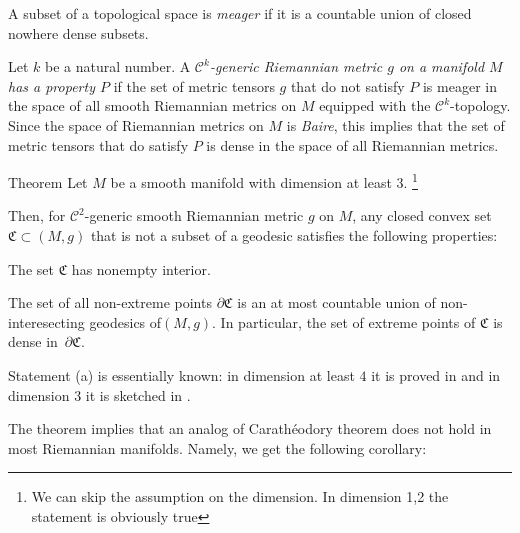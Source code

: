\documentclass[a4paper,10pt]{article}
\begin{document}
{\color{red}  A subset of a topological space is \emph{meager} if it is a countable union
	of closed nowhere dense subsets.   
	
	
	Let $k$ be a natural number.
 A \emph{$\mathcal C^k$-generic Riemannian metric $g$ on a manifold $M$ 
has a property $P$} if the set   of metric tensors $g$ that do not  satisfy $P$ 
is meager  in the space  of all smooth Riemannian metrics on $M$ equipped  with the  $\mathcal C^k$-topology.
Since the space of Riemannian metrics on $M$ is \emph{Baire}, this implies that the set
of metric tensors that do satisfy $P$ is dense in the space of all  Riemannian metrics.  }




\begin{thm}{Theorem}\label{thm:main}
Let $M$ be a smooth manifold with dimension at least 3. \footnote{We can skip the assumption on the dimension. In dimension 1,2 the statement is obviously true}

Then, for $\mathcal C^2$-generic smooth Riemannian metric $g$ on $M$,
any closed convex set $\mathfrak{C}\subset (M,g)$ that is not a subset of a geodesic
satisfies the following properties:

\begin{subthm}{}
The set $\mathfrak{C}$ has nonempty interior.
\end{subthm}

\begin{subthm}{}
The set of all non-extreme points $\partial\mathfrak{C}$ {\color{red} is an at most countable union of non-interesecting geodesics of$(M,g)$}.
In particular, the set of
 extreme points of $\mathfrak{C}$ is dense in~$\partial\mathfrak{C}$.
\end{subthm}

\end{thm}

{\color{red}
Statement (a) is essentially known: in dimension at least $4$ it is proved in \cite{Wilhelm}
and in dimension $3$ it is sketched in  \cite{Bryant}.}

The theorem implies that an analog of Carathéodory theorem does not hold in most  Riemannian manifolds.
Namely, we get the following corollary:
\end{document}
